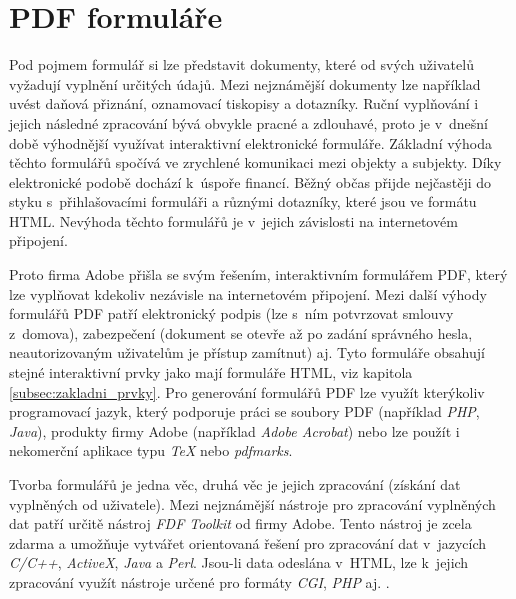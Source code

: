 \section{PDF formuláře}
Pod pojmem formulář si lze představit dokumenty, které od svých uživatelů vyžadují vyplnění určitých údajů. Mezi nejznámější dokumenty lze například uvést daňová přiznání, oznamovací tiskopisy a dotazníky. Ruční vyplňování i jejich následné zpracování bývá obvykle pracné a zdlouhavé, proto je v~dnešní době výhodnější využívat interaktivní elektronické formuláře. Základní výhoda těchto formulářů spočívá ve zrychlené komunikaci mezi objekty a subjekty. Díky elektronické podobě dochází k~úspoře financí. Běžný občas přijde nejčastěji do styku s~přihlašovacími formuláři a různými dotazníky, které jsou ve formátu HTML. Nevýhoda těchto formulářů je v~jejich závislosti na internetovém připojení. 
\par
Proto firma Adobe přišla se svým řešením, interaktivním formulářem PDF, který lze vyplňovat kdekoliv nezávisle na internetovém připojení. Mezi další výhody formulářů PDF patří elektronický podpis (lze s~ním potvrzovat smlouvy z~domova), zabezpečení (dokument se otevře až po zadání správného hesla, neautorizovaným uživatelům je přístup zamítnut) aj. Tyto formuláře obsahují stejné interaktivní prvky jako mají formuláře HTML, viz kapitola \ref{subsec:zakladni_prvky}. Pro generování formulářů PDF lze využít kterýkoliv programovací jazyk, který podporuje práci se soubory PDF (například \textit{PHP}, \textit{Java}), produkty firmy Adobe (například \textit{Adobe Acrobat}) nebo lze použít i nekomerční aplikace typu \textit{TeX} nebo \textit{pdfmarks}.
\par
Tvorba formulářů je jedna věc, druhá věc je jejich zpracování (získání dat vyplněných od uživatele). Mezi nejznámější nástroje pro zpracování vyplněných dat patří určitě nástroj \textit{FDF Toolkit} od firmy Adobe. Tento nástroj je zcela zdarma a umožňuje vytvářet orientovaná řešení pro zpracování dat v~jazycích \textit{C/C++}, \textit{ActiveX}, \textit{Java} a \textit{Perl}. Jsou-li data odeslána v~HTML, lze k~jejich zpracování využít nástroje určené pro formáty \textit{CGI}, \textit{PHP} aj. \cite{PDFForm}.
